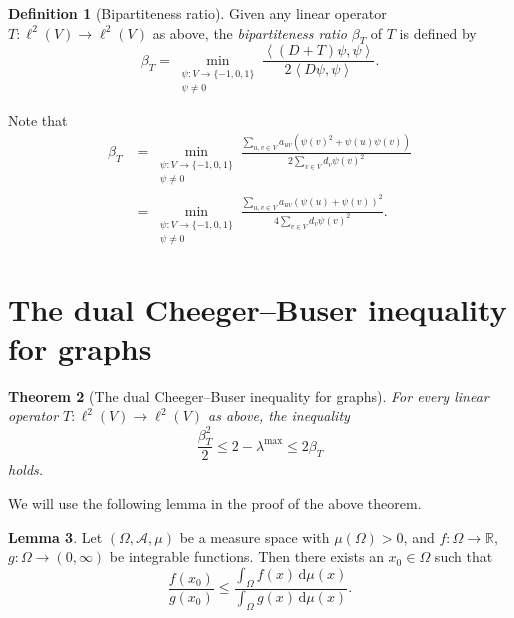 \documentclass[12pt,a4paper,bold]{thesis}
\newtheorem{thm}{Theorem}[chapter]
\theoremstyle{definition}
\newtheorem{defn}[thm]{Definition}
\newtheorem{lemma}[thm]{Lemma}
\newcommand*{\map}[3]{#1 \colon #2 \to #3}
\newcommand*{\ip}[2]{\left\langle #1 , #2 \right\rangle}
\begin{document}
\begin{defn}[Bipartiteness ratio]
    Given any linear operator $\map{T}{\ell^2(V)}{\ell^2(V)}$ as above, 
    the \emph{bipartiteness ratio} $\beta_T$ of $T$ is defined by
    \begin{equation*}
        \beta_T = \min_{\substack{\map{\psi}{V}{\{-1,0,1\}} \\ \psi \neq 0}} 
        \frac{\ip{(D+T)\psi}{\psi}}{2 \ip{D \psi}{\psi}}.
    \end{equation*}
\end{defn}

Note that
\begin{align} 
    \beta_T 
    & = 
    \min_{\substack{\map{\psi}{V}{\{-1,0,1\}} \\ \psi \neq 0}} 
    \frac{\sum_{u,v \in V} a_{uv} (\psi(v)^2 + \psi(u)\psi(v))}
    {2 \sum_{v \in V} d_v \psi(v)^2} \label{eq:explicit-betaI}
    \\
    & =
    \min_{\substack{\map{\psi}{V}{\{-1,0,1\}} \\ \psi \neq 0}} 
    \frac{\sum_{u,v \in V} a_{uv} (\psi(u) + \psi(v))^2}
    {4 \sum_{v \in V} d_v \psi(v)^2}. \label{eq:explicit-betaII}
\end{align}

\section[The dual Cheeger--Buser inequality for graphs]
{The dual Cheeger--Buser inequality for graphs
}

\begin{thm}[The dual Cheeger--Buser inequality for graphs] \label{thm:dualCBGraphs}
    For every linear operator $\map{T}{\ell^2(V)}{\ell^2(V)}$ as above, the inequality
    \begin{equation*}
        \frac{\beta_T^2}{2} \leq 2 - \lambda^{\max} \leq 2 \beta_T
    \end{equation*}
    holds.
\end{thm}

We will use the following lemma in the proof of the above theorem. 

\begin{lemma} \label{lemma:f/g&intf/intg}
    Let $(\Omega, \mathcal{A}, \mu)$ be a measure space with $\mu(\Omega) > 0$,
    and $\map{f}{\Omega}{\mathbb{R}}$, $\map{g}{\Omega}{(0,\infty)}$ be integrable
    functions. Then there exists an $x_0 \in \Omega$ such that 
    \begin{equation*}
        \frac{f(x_0)}{g(x_0)} \leq \frac{\int_{\Omega} f(x)\, \mathrm{d}\mu(x)}
        {\int_{\Omega} g(x)\, \mathrm{d}\mu(x)}.
    \end{equation*}
\end{lemma}
\end{document}
